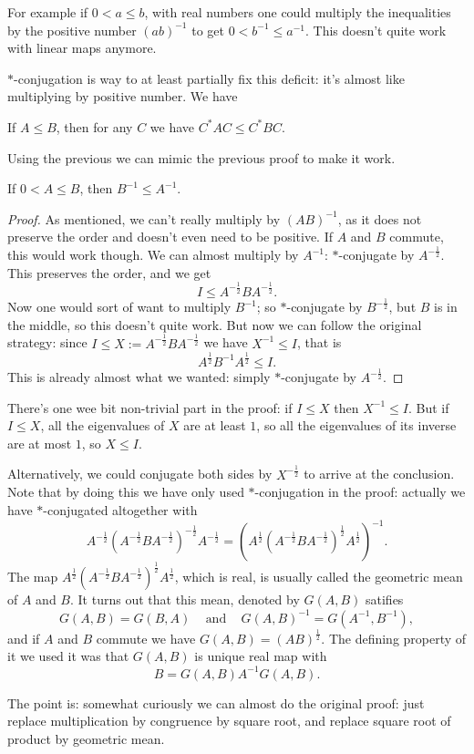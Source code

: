For example if $0 < a \leq b$, with real numbers one could multiply the inequalities by the positive number $(a b)^{-1}$ to get $0 < b^{-1} \leq a^{-1}$. This doesn't quite work with linear maps anymore.

$*$-conjugation is way to at least partially fix this deficit: it's almost like multiplying by positive number. We have
\begin{prop}
	If $A \leq B$, then for any $C$ we have $C^{*} A C \leq C^{*} B C$.
\end{prop}

Using the previous we can mimic the previous proof to make it work.

\begin{lause}\label{inverse_decreasing}
	If $0 < A \leq B$, then $B^{-1} \leq A^{-1}$.
\end{lause}
\begin{proof}
	As mentioned, we can't really multiply by $(A B)^{-1}$, as it does not preserve the order and doesn't even need to be positive. If $A$ and $B$ commute, this would work though. We can almost multiply by $A^{-1}$: $*$-conjugate by $A^{-\frac{1}{2}}$. This preserves the order, and we get
	\[
		I \leq A^{-\frac{1}{2}} B A^{-\frac{1}{2}}.
	\]
	Now one would sort of want to multiply $B^{-1}$; so $*$-conjugate by $B^{-\frac{1}{2}}$, but $B$ is in the middle, so this doesn't quite work. But now we can follow the original strategy: since $I \leq X := A^{-\frac{1}{2}} B A^{-\frac{1}{2}}$ we have $X^{-1} \leq I$, that is
	\[
		A^{\frac{1}{2}} B^{-1} A^{\frac{1}{2}} \leq I.
	\]
	This is already almost what we wanted: simply $*$-conjugate by $A^{-\frac{1}{2}}$.
\end{proof}

There's one wee bit non-trivial part in the proof: if $I \leq X$ then $X^{-1} \leq I$. But if $I \leq X$, all the eigenvalues of $X$ are at least $1$, so all the eigenvalues of its inverse are at most $1$, so $X \leq I$.

\begin{huom}

Alternatively, we could conjugate both sides by $X^{-\frac{1}{2}}$ to arrive at the conclusion. Note that by doing this we have only used $*$-conjugation in the proof: actually we have $*$-conjugated altogether with 
\[
	A^{-\frac{1}{2}} (A^{-\frac{1}{2}}B A^{-\frac{1}{2}})^{-\frac{1}{2}} A^{-\frac{1}{2}} = (A^{\frac{1}{2}} (A^{-\frac{1}{2}}B A^{-\frac{1}{2}})^{\frac{1}{2}} A^{\frac{1}{2}})^{-1}.
\]
The map $A^{\frac{1}{2}} (A^{-\frac{1}{2}}B A^{-\frac{1}{2}})^{\frac{1}{2}} A^{\frac{1}{2}}$, which is real, is usually called the geometric mean of $A$ and $B$. It turns out that this mean, denoted by $G(A, B)$ satifies
\[
	G(A, B) = G(B, A) \;\;\; \text{ and } \;\;\; G(A, B)^{-1} = G(A^{-1}, B^{-1}),
\]
and if $A$ and $B$ commute we have $G(A, B) = (A B)^{\frac{1}{2}}$. The defining property of it we used it was that $G(A, B)$ is unique real map with
\[
	B = G(A, B) A^{-1} G(A, B).
\]

The point is: somewhat curiously we can almost do the original proof: just replace multiplication by congruence by square root, and replace square root of product by geometric mean.

\end{huom}

